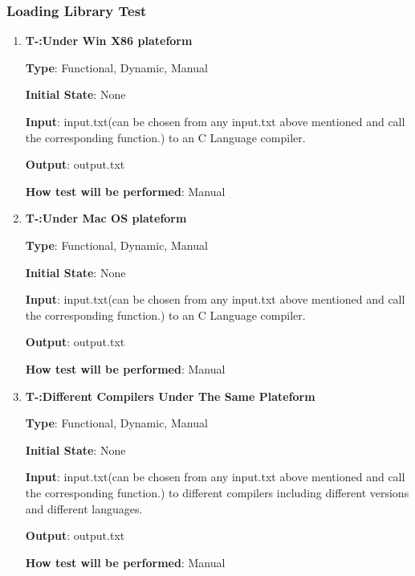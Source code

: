 \documentclass[12pt, titlepage]{article}
\newcounter{tnum}
\begin{document}

\subsubsection{Loading Library Test}

\begin{enumerate}

\item{\textbf{T-\thetnum \label{Win86}:Under Win X86 plateform}}

\textbf {Type}: Functional, Dynamic, Manual
					
\textbf {Initial State}: None
					
\textbf {Input}: input.txt(can be chosen from any input.txt above
mentioned and call the corresponding function.) to an C Language
compiler.
					
\textbf {Output}: output.txt
					
\textbf {How test will be performed}: Manual


\item{\textbf{T-\thetnum \label{Mac}:Under Mac OS
      plateform }}

\textbf {Type}: Functional, Dynamic, Manual
					
\textbf {Initial State}: None
					
\textbf {Input}:  input.txt(can be chosen from any input.txt above mentioned and call the corresponding function.) to an C Language compiler.
					
\textbf {Output}: output.txt
					
\textbf {How test will be performed}: Manual


\item{\textbf{T-\thetnum \label{Compilers}:Different Compilers Under The Same Plateform}}

\textbf {Type}: Functional, Dynamic, Manual
					
\textbf {Initial State}: None
					
\textbf {Input}:  input.txt(can be chosen from any input.txt above mentioned and call the corresponding function.) to different compilers including different versions and different languages.
					
\textbf {Output}: output.txt
					
\textbf {How test will be performed}: Manual


\end{enumerate}
\end{document}
